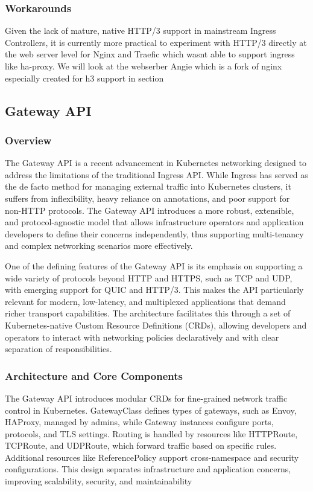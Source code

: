 \subsubsection{Workarounds}
Given the lack of mature, native HTTP/3 support in mainstream Ingress Controllers, it is currently more practical to experiment with HTTP/3 directly at the web server level for Nginx and Traefic which wasnt able to support ingress like ha-proxy. We will look at the webserber Angie which is a fork of nginx especially created for h3 support in section

\subsection{Gateway API}
\subsubsection{Overview}
The Gateway API is a recent advancement in Kubernetes networking designed to address the limitations of the traditional Ingress API. While Ingress has served as the de facto method for managing external traffic into Kubernetes clusters, it suffers from inflexibility, heavy reliance on annotations, and poor support for non-HTTP protocols. The Gateway API introduces a more robust, extensible, and protocol-agnostic model that allows infrastructure operators and application developers to define their concerns independently, thus supporting multi-tenancy and complex networking scenarios more effectively.

One of the defining features of the Gateway API is its emphasis on supporting a wide variety of protocols beyond HTTP and HTTPS, such as TCP and UDP, with emerging support for QUIC and HTTP/3. This makes the API particularly relevant for modern, low-latency, and multiplexed applications that demand richer transport capabilities. The architecture facilitates this through a set of Kubernetes-native Custom Resource Definitions (CRDs), allowing developers and operators to interact with networking policies declaratively and with clear separation of responsibilities.


\subsubsection{Architecture and Core Components}
The Gateway API introduces modular CRDs for fine-grained network traffic control in Kubernetes. GatewayClass defines types of gateways, such as Envoy, HAProxy, managed by admins, while Gateway instances configure ports, protocols, and TLS settings. Routing is handled by resources like HTTPRoute, TCPRoute, and UDPRoute, which forward traffic based on specific rules. Additional resources like ReferencePolicy support cross-namespace and security configurations. This design separates infrastructure and application concerns, improving scalability, security, and maintainability


